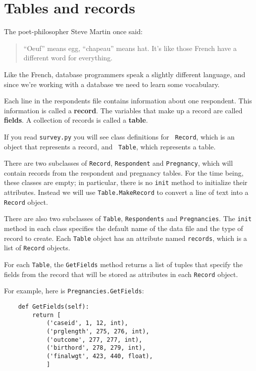 \documentclass[10pt]{book}
\begin{document}
\section{Tables and records}

The poet-philosopher Steve Martin once said:

\begin{quote}
``Oeuf'' means egg, ``chapeau'' means hat.  It's like those French
  have a different word for everything.
\end{quote}

Like the French, database programmers speak a slightly
different language, and since we're working with a database we need
to learn some vocabulary.

Each line in the respondents file contains information about one
respondent.  This information is called a {\bf record}.  The
variables that make up a record are called {\bf fields}.  A
collection of records is called a {\bf table}.

If you read {\tt survey.py} you will see class definitions for {\tt
  Record}, which is an object that represents a record, and {\tt
  Table}, which represents a table.

There are two subclasses of
{\tt Record}, {\tt Respondent} and {\tt Pregnancy}, which will
contain records from the respondent and pregnancy tables.
For the time being, these classes are empty; in particular, there
is no {\tt init} method to initialize their attributes.  Instead
we will use {\tt Table.MakeRecord} to convert a line of text into
a {\tt Record} object.

There are also two subclasses of {\tt Table}, {\tt Respondents}
and {\tt Pregnancies}.  The {\tt init} method in each class
specifies the default name of the data file and the type of
record to create.  Each {\tt Table} object has an attribute
named {\tt records}, which is a list of {\tt Record} objects.

For each {\tt Table}, the {\tt GetFields} method returns
a list of tuples that specify the fields from the record that
will be stored as attributes in each {\tt Record} object.

For example, here is {\tt Pregnancies.GetFields}:

\begin{verbatim}
    def GetFields(self):
        return [
            ('caseid', 1, 12, int),
            ('prglength', 275, 276, int),
            ('outcome', 277, 277, int),
            ('birthord', 278, 279, int),
            ('finalwgt', 423, 440, float),
            ]
\end{verbatim}
\end{document}
